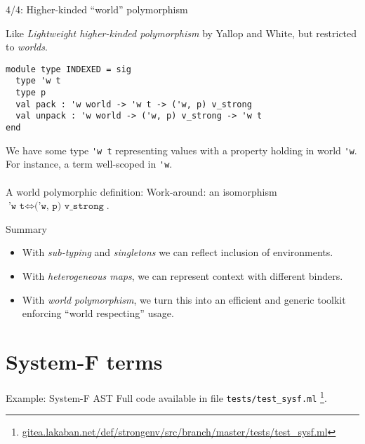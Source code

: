 \documentclass{beamer}          %
\begin{document}
\begin{frame}[fragile]{4/4: Higher-kinded ``world'' polymorphism}

Like {\em Lightweight higher-kinded polymorphism} by Yallop and White, but restricted to {\em worlds}.
\begin{lstlisting}
module type INDEXED = sig
  type 'w t
  type p
  val pack : 'w world -> 'w t -> ('w, p) v_strong
  val unpack : 'w world -> ('w, p) v_strong -> 'w t
end
\end{lstlisting}

We have some type \lstinline{'w t} representing values with a property holding in world
\lstinline{'w}. For instance, a term well-scoped in \lstinline{'w}. \\
\pause ~ \\
A world polymorphic definition:
\pause
Work-around: an isomorphism $\texttt{'w t} \Leftrightarrow \texttt{('w, p) v\_strong}$. \\
\end{frame}

\begin{frame}{Summary}
  \begin{itemize}
    \item With {\em sub-typing} and {\em singletons} we can reflect inclusion of environments.
    \item With {\em heterogeneous maps}, we can represent context with different binders.

    \item With {\em world polymorphism}, we turn this into an efficient and
          generic toolkit enforcing ``world respecting'' usage.
  \end{itemize}
\end{frame}

\section{System-F terms}

\begin{frame}{Example: System-F AST}
  Full code available in file {\tt tests/test\_sysf.ml}
  \footnote{\href{https://gitea.lakaban.net/def/strongenv/src/branch/master/tests/test_sysf.ml}{gitea.lakaban.net/def/strongenv/src/branch/master/tests/test\_sysf.ml}}.

\end{frame}
\end{document}
